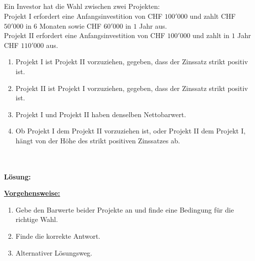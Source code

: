 \subsection*{}
Ein Investor hat die Wahl zwischen zwei Projekten:\\
Projekt I erfordert eine Anfangsinvestition von CHF $ 100'000  $ und zahlt CHF $ 50'000 $ in $ 6 $ Monaten sowie CHF $ 60'000 $ in $ 1 $ Jahr aus. \\
Projekt II erfordert eine Anfangsinvestition von CHF $ 100'000 $ und zahlt in $ 1 $ Jahr CHF $ 110'000 $ aus.
\renewcommand{\labelenumi}{(\alph{enumi})}
\begin{enumerate}
	\item 
	Projekt I ist Projekt II vorzuziehen, gegeben, dass der Zinssatz strikt positiv ist.
	\item
	Projekt II ist Projekt I vorzuziehen, gegeben, dass der Zinssatz strikt positiv ist.
	\item
	Projekt I und Projekt II haben denselben Nettobarwert.
	\item
	Ob Projekt I dem Projekt II vorzuziehen ist, oder Projekt II dem Projekt I, hängt von der Höhe des strikt positiven Zinssatzes ab.
\end{enumerate}
\ \\
\ \\
\textbf{Lösung:}
\begin{mdframed}
\underline{\textbf{Vorgehensweise:}}
\renewcommand{\labelenumi}{\theenumi.}
\begin{enumerate}
\item Gebe den Barwerte beider Projekte an und finde eine Bedingung für die richtige Wahl.
\item Finde die korrekte Antwort.
\item Alternativer Lösungsweg.
\end{enumerate}
\end{mdframed}

